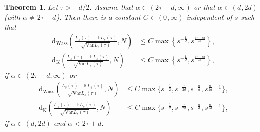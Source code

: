 \documentclass{article}
\newtheorem{theorem}{Theorem}[section]
\theoremstyle{definition}
\numberwithin{equation}{section}
\theoremstyle{remark}
\newcommand{\E}{\mathbb{E}}
\newcommand{\Var}{\mathrm{Var}}
\begin{document}
\begin{theorem} \label{CLT:sumsedgelengths}
    Let $\tau > -d/2$. Assume that $\alpha \in (2\tau + d, \infty)$ or that $\alpha \in (d,2d)$ (with $\alpha \neq 2\tau + d$). Then there is a constant $C \in (0, \infty)$ independent of $s$ such that
    \begin{align*}
	\mathrm{d}_{\mathrm{Wass}}\left(\frac{L_s(\tau)-\E L_s(\tau)}{\sqrt{\Var L_s(\tau)}},N\right) & \le C \max\left\{ s^{-\frac{1}{2}} , s^{\frac{4\tau -{\alpha}}{2d}}  \right\},\\
	\mathrm{d}_{\mathrm{K}}\left(\frac{L_s(\tau)-\E L_s(\tau)}{\sqrt{\Var L_s(\tau)}},N\right) & \le  C \max\left\{ s^{-\frac{1}{2}} , s^{\frac{4\tau -{\alpha}}{2d}}\right\},
\end{align*}
    if $\alpha\in (2\tau + d, \infty)$ or
     \begin{align*}
	\mathrm{d}_{\mathrm{Wass}}\left(\frac{L_s(\tau)-\E L_s(\tau)}{\sqrt{\Var L_s(\tau)}},N\right) & \le C \max\{ s^{-\frac{1}{2}},  s^{-\frac{\tau}{2d}} ,  s^{-\frac{\alpha}{d}}, s^{\frac{\alpha}{2d}-1} \},\\
	\mathrm{d}_{\mathrm{K}}\left(\frac{L_s(\tau)-\E L_s(\tau)}{\sqrt{\Var L_s(\tau)}},N\right) & \le  C \max\{ s^{-\frac{1}{2}},  s^{-\frac{\tau}{2d}} ,  s^{-\frac{\alpha}{d}}, s^{\frac{\alpha}{2d}-1} \} ,
    \end{align*}
    if $\alpha \in (d,2d)$ and $\alpha < 2\tau + d$.
\end{theorem}
\end{document}
